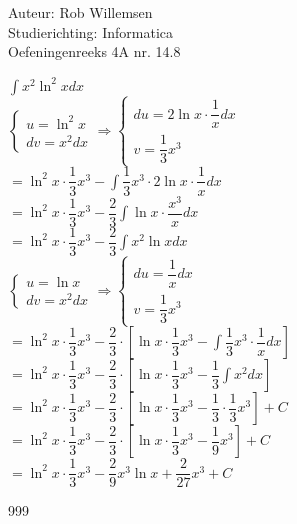 \documentclass[a4paper]{article}
\newcommand{\dint}{\displaystyle\int}
\begin{document}
\noindent \large Auteur: Rob Willemsen \\
\noindent \large Studierichting: Informatica \\
\noindent \large Oefeningenreeks 4A nr. 14.8 \\

\medskip

\normalsize

$\dint x^2 \ln^2 x dx$ \\

$ \left\{
\begin{array}{l}
u = \ln^2 x \\
dv = x^2 dx
\end{array} \right.
\Rightarrow
\left\{
\begin{array}{l}
du = 2 \ln x \cdot \dfrac{1}{x} dx \\
v = \dfrac{1}{3} x^3
\end{array} 
\right.$ \\

$= \ln^2 x \cdot \dfrac{1}{3} x^3 - \dint \dfrac{1}{3} x^3 \cdot 2 \ln x \cdot \dfrac{1}{x} dx$ \\

$= \ln^2 x \cdot \dfrac{1}{3} x^3 - \dfrac{2}{3} \dint \ln x \cdot \dfrac{x^3}{x} dx$ \\

$= \ln^2 x \cdot \dfrac{1}{3} x^3 - \dfrac{2}{3} \dint x^2 \ln x dx$ \\

$ \left\{
\begin{array}{l}
u = \ln x \\
dv = x^2 dx
\end{array} \right.
\Rightarrow
\left\{
\begin{array}{l}
du = \dfrac{1}{x} dx \\
v = \dfrac{1}{3} x^3
\end{array} 
\right.$ \\

$= \ln^2 x \cdot \dfrac{1}{3} x^3 - \dfrac{2}{3} \cdot \left[\ln x \cdot \dfrac{1}{3} x^3 - \dint \dfrac{1}{3} x^3 \cdot \dfrac{1}{x} dx\right]$ \\

$= \ln^2 x \cdot \dfrac{1}{3} x^3 - \dfrac{2}{3} \cdot \left[\ln x \cdot \dfrac{1}{3} x^3 - \dfrac{1}{3} \dint x^2 dx\right]$ \\

$= \ln^2 x \cdot \dfrac{1}{3} x^3 - \dfrac{2}{3} \cdot \left[\ln x \cdot \dfrac{1}{3} x^3 - \dfrac{1}{3} \cdot \dfrac{1}{3} x^3\right] + C$ \\

$= \ln^2 x \cdot \dfrac{1}{3} x^3 - \dfrac{2}{3} \cdot \left[\ln x \cdot \dfrac{1}{3} x^3 - \dfrac{1}{9} x^3\right] + C$ \\

$= \ln^2 x \cdot \dfrac{1}{3} x^3 - \dfrac{2}{9}x^3 \ln x + \dfrac{2}{27} x^3 + C$ \\

\begin{thebibliography}{999}
\end{thebibliography}
\end{document}

